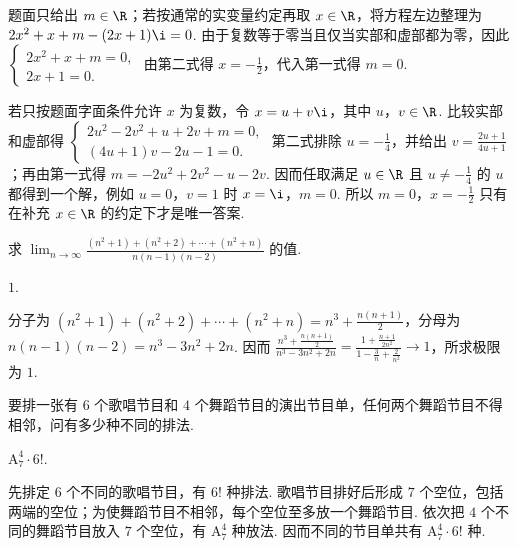 \documentclass[UTF8,a4paper,oneside,11pt]{ctexbook}
\begin{document}
\begin{solution}
题面只给出 \(m\in\R\)；若按通常的实变量约定再取 \(x\in\R\)，将方程左边整理为 \(2x^{2}+x+m-(2x+1)\i=0\). 由于复数等于零当且仅当实部和虚部都为零，因此
\(\begin{cases}
2x^{2}+x+m=0,\\
2x+1=0.
\end{cases}\)
由第二式得 \(x=-\frac{1}{2}\)，代入第一式得 \(m=0\).

若只按题面字面条件允许 \(x\) 为复数，令 \(x=u+v\i\)，其中 \(u\)，\(v\in\R\). 比较实部和虚部得
\(\begin{cases}
2u^{2}-2v^{2}+u+2v+m=0,\\
(4u+1)v-2u-1=0.
\end{cases}\)
第二式排除 \(u=-\frac{1}{4}\)，并给出 \(v=\frac{2u+1}{4u+1}\)；再由第一式得 \(m=-2u^{2}+2v^{2}-u-2v\). 因而任取满足 \(u\in\R\) 且 \(u\ne-\frac{1}{4}\) 的 \(u\) 都得到一个解，例如 \(u=0\)，\(v=1\) 时 \(x=\i\)，\(m=0\). 所以 \(m=0\)，\(x=-\frac{1}{2}\) 只有在补充 \(x\in\R\) 的约定下才是唯一答案.
\end{solution}

\begin{problem}

求 \(\displaystyle\lim_{n\to\infty}\frac{(n^2 + 1) + (n^2 + 2) + \cdots + (n^2 + n)}{n(n - 1)(n - 2)}\) 的值\fillinblank{}.
\end{problem}

\begin{answer}
\(1\).
\end{answer}

\begin{solution}
分子为 \((n^{2}+1)+(n^{2}+2)+\cdots+(n^{2}+n)=n^{3}+\frac{n(n+1)}{2}\)，分母为 \(n(n-1)(n-2)=n^{3}-3n^{2}+2n\). 因而 \(\displaystyle\frac{n^{3}+\frac{n(n+1)}{2}}{n^{3}-3n^{2}+2n}=\frac{1+\frac{n+1}{2n^{2}}}{1-\frac{3}{n}+\frac{2}{n^{2}}}\to1\)，所求极限为 \(1\).
\end{solution}

\begin{problem}

要排一张有 \(6\) 个歌唱节目和 \(4\) 个舞蹈节目的演出节目单，任何两个舞蹈节目不得相邻，问有多少种不同的排法\fillinblank{}.
\end{problem}

\begin{answer}
\(\mathrm A_7^4\cdot 6!\).
\end{answer}

\begin{solution}
先排定 \(6\) 个不同的歌唱节目，有 \(6!\) 种排法. 歌唱节目排好后形成 \(7\) 个空位，包括两端的空位；为使舞蹈节目不相邻，每个空位至多放一个舞蹈节目. 依次把 \(4\) 个不同的舞蹈节目放入 \(7\) 个空位，有 \(\mathrm A_7^4\) 种放法. 因而不同的节目单共有 \(\mathrm A_7^4\cdot6!\) 种.
\end{solution}
\end{document}
